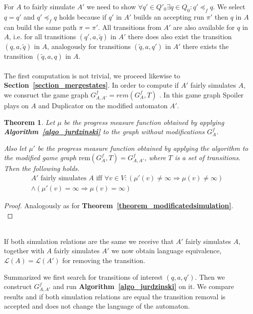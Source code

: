 \documentclass[12pt,oneside,bibliography=totoc,abstracton]{scrartcl}
\newcommand{\theoremref}[1]{\textbf{Theorem~\ref{#1}}}
\newcommand{\sectionref}[1]{\textbf{Section~\ref{#1}}}
\newcommand{\algoref}[1]{\textbf{Algorithm~\ref{#1}}}
\newtheorem{mytheorem}{Theorem}
\begin{document}
For $A$ to fairly simulate $A'$ we need to show $\forall q' \in Q'_0 \exists q \in Q_0 : q' \preceq_f q$.
We select $q = q'$ and $q' \preceq_f q$ holds because if $q'$ in $A'$ builds an accepting run $\pi'$
then $q$ in $A$ can build the same path $\pi = \pi'$. All transitions from $A'$ are also available for
$q$ in $A$, i.e. for all transitions $(q', a, \tilde{q})$ in $A'$ there does also exist the transition
$(q, a, \tilde{q})$ in $A$, analogously for transitions $(\tilde{q}, a, q')$ in $A'$ there exists the
transition $(\tilde{q}, a, q)$ in $A$.\\\\
The first computation is not trivial, we proceed likewise to \sectionref{section_mergestates}.
In order to compute if $A'$ fairly simulates $A$, we consruct the game graph $G^f_{A, A'} = rem(G^f_A, T)$ .
In this game graph Spoiler plays on $A$ and Duplicator on the modified automaton $A'$.
\begin{mytheorem}\label{theorem_modificatedsimulationremove}
	Let $\mu$ be the progress measure function obtained by applying \algoref{algo_jurdzinski}
	to the graph without modifications $G^f_A$.
	
	Also let $\mu'$ be the progress measure function obtained by applying the algorithm to the
	modified game graph $\text{rem}(G^f_A, T) = G^f_{A, A'}$, where $T$ is a set of transitions.
	Then the following holds.
	\begin{align*}
		A' \text{ fairly simulates } A \text{ iff } \forall v \in V : (\mu'(v) \neq \infty \Rightarrow \mu(v) \neq \infty)\\
		\land (\mu'(v) = \infty \Rightarrow \mu(v) = \infty)
	\end{align*}
\end{mytheorem}
\begin{proof}
	Analogously as for \theoremref{theorem_modificatedsimulation}.\\
\end{proof}\quad\\
If both simulation relations are the same we receive that $A'$ fairly simulates $A$,
together with $A$ fairly simulates $A'$ we now obtain language equivalence, $\mathcal{L}(A) = \mathcal{L}(A')$
for removing the transition.

Summarized we first search for transitions of interest $(q, a, q')$. Then we construct $G^f_{A, A'}$
and run \algoref{algo_jurdzinski} on it. We compare results and if both simulation relations are equal the
transition removal is accepted and does not change the language of the automaton.
\end{document}
